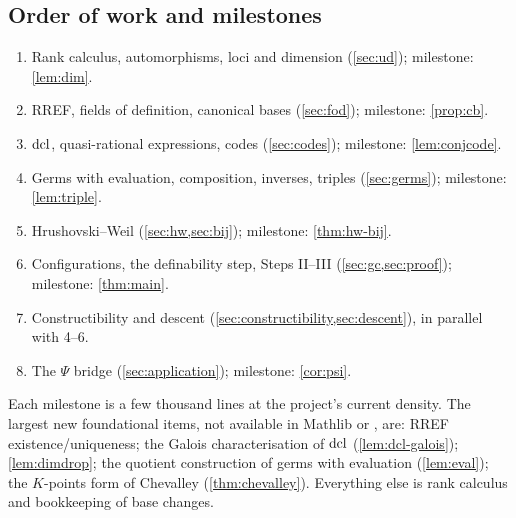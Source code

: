 \subsection{Order of work and milestones}

\begin{enumerate}[nosep]
\item Rank calculus, automorphisms, loci and dimension (\cref{sec:ud}); milestone:
  \cref{lem:dim}.
\item RREF, fields of definition, canonical bases (\cref{sec:fod}); milestone:
  \cref{prop:cb}.
\item $\operatorname{dcl}$, quasi-rational expressions, codes (\cref{sec:codes}); milestone:
  \cref{lem:conjcode}.
\item Germs with evaluation, composition, inverses, triples (\cref{sec:germs});
  milestone: \cref{lem:triple}.
\item Hrushovski--Weil (\cref{sec:hw,sec:bij}); milestone: \cref{thm:hw-bij}.
\item Configurations, the definability step, Steps II--III (\cref{sec:gc,sec:proof});
  milestone: \cref{thm:main}.
\item Constructibility and descent (\cref{sec:constructibility,sec:descent}), in
  parallel with 4--6.
\item The $\Psi$ bridge (\cref{sec:application}); milestone: \cref{cor:psi}.
\end{enumerate}

\begin{leannote}
Each milestone is a few thousand lines at the project's current density.  The
largest new foundational items, not available in Mathlib or , are:
RREF existence/uniqueness; the Galois characterisation of $\operatorname{dcl}$ (\cref{lem:dcl-galois});
\cref{lem:dimdrop}; the quotient construction of germs with evaluation
(\cref{lem:eval}); the $K$-points form of Chevalley (\cref{thm:chevalley}).  Everything
else is rank calculus and bookkeeping of base changes.
\end{leannote}
